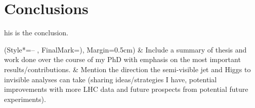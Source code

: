 \chapter{Conclusions}
\label{chap:conclusions}

his is the conclusion.

\begin{easylist}[itemize]
\ListProperties(Style*=-- , FinalMark={)}, Margin=0.5cm)
& Include a summary of thesis and work done over the course of my PhD with emphasis on the most important results/contributions.
& Mention the direction the semi-visible jet and Higgs to invisible analyses can take (sharing ideas/strategies I have, potential improvements with more LHC data and future prospects from potential future experiments).
\end{easylist}
